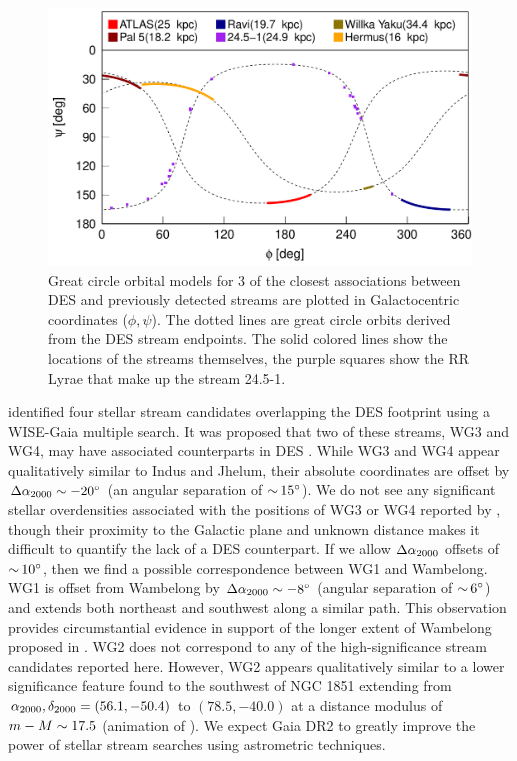 \documentclass[twocolumn]{aastex61}
\begin{document}
\begin{figure}[t]
\centering
\includegraphics[width=0.95\columnwidth]{stream_assoc_v5p0.pdf}
\caption{ Great circle orbital models for 3 of the closest associations between DES and previously detected streams are plotted in Galactocentric coordinates ($\phi,\psi$). The dotted lines are great circle orbits derived from the DES stream endpoints. The solid colored lines show the locations of the streams themselves, the purple squares show the RR Lyrae \citep{Mateu:2017} that make up the stream 24.5-1.
}
\label{fig:stream_assoc}
\end{figure}

\citet{Agnello:2017} identified four stellar stream candidates overlapping the DES footprint using a WISE-Gaia multiple search.
It was proposed that two of these streams, WG3 and WG4, may have associated counterparts in DES \citep{Agnello:2017}. 
While WG3 and WG4 appear qualitatively similar to Indus and Jhelum, their absolute coordinates are offset by $\Delta {\ensuremath{\alpha_{2000}}} \sim -20{}^{\circ}$ (an angular separation of $ {\sim}\, 15{}^{\circ}$).
We do not see any significant stellar overdensities associated with the positions of WG3 or WG4 reported by \citet{Agnello:2017}, though their proximity to the Galactic plane and unknown distance makes it difficult to quantify the lack of a DES counterpart.
If we allow $\Delta {\ensuremath{\alpha_{2000}}}$ offsets of $ {\sim}\, 10{}^{\circ}$, then we find a possible correspondence between WG1 and Wambelong.
WG1 is offset from Wambelong by $\Delta {\ensuremath{\alpha_{2000}}} \sim -8{}^{\circ}$ (angular separation of $ {\sim}\, 6 {}^{\circ}$) and extends both northeast and southwest along a similar path.
This observation provides circumstantial evidence in support of the longer extent of Wambelong proposed in .
WG2 does not correspond to any of the high-significance stream candidates reported here.
However, WG2 appears qualitatively similar to a lower significance feature found to the southwest of NGC 1851 extending from ${\alpha_{2000}},{\delta_{2000}} = (56.1, -50.4)$ to $(78.5, -40.0)$ at a distance modulus of $m - M \sim 17.5$ (animation of ).
We expect Gaia DR2 to greatly improve the power of stellar stream searches using astrometric techniques.
\end{document}
